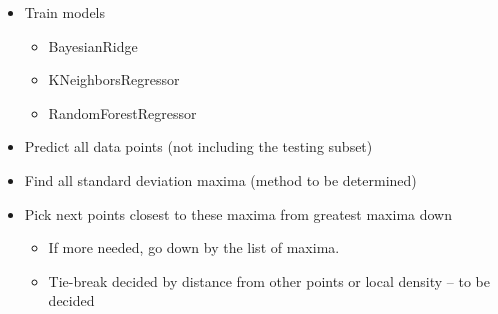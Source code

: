 \documentclass{article}
\begin{document}
\begin{itemize}
    \item Train models
    \begin{itemize}
        \item BayesianRidge
        \item KNeighborsRegressor
        \item RandomForestRegressor
    \end{itemize}
    \item Predict all data points (not including the testing subset)
    \item Find all standard deviation maxima (method to be determined)
    \item Pick next points closest to these maxima from greatest maxima down
    \begin{itemize}
        \item If more needed, go down by the list of maxima.
        \item Tie-break decided by distance from other points or local density -- to be decided
    \end{itemize} 
\end{itemize}
\end{document}
